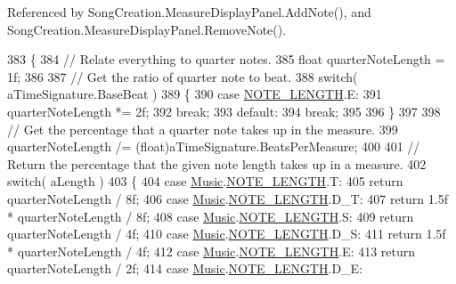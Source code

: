 Referenced by Song\+Creation.\+Measure\+Display\+Panel.\+Add\+Note(), and Song\+Creation.\+Measure\+Display\+Panel.\+Remove\+Note().


\begin{DoxyCode}
383     \{
384         \textcolor{comment}{// Relate everything to quarter notes.}
385         \textcolor{keywordtype}{float} quarterNoteLength = 1f;
386 
387         \textcolor{comment}{// Get the ratio of quarter note to beat.}
388         \textcolor{keywordflow}{switch}( aTimeSignature.BaseBeat )
389         \{
390             \textcolor{keywordflow}{case} \hyperlink{group___music_enums_gaf11b5f079adbb21c800b9eca1c5c3cbd}{NOTE\_LENGTH}.E:
391                 quarterNoteLength *= 2f;
392                 \textcolor{keywordflow}{break};
393             \textcolor{keywordflow}{default}:
394                 \textcolor{keywordflow}{break};
395 
396         \}
397 
398         \textcolor{comment}{// Get the percentage that a quarter note takes up in the measure.}
399         quarterNoteLength /= (float)aTimeSignature.BeatsPerMeasure;
400 
401         \textcolor{comment}{// Return the percentage that the given note length takes up in a measure.}
402         \textcolor{keywordflow}{switch}( aLength )
403         \{
404             \textcolor{keywordflow}{case} \hyperlink{class_music}{Music}.\hyperlink{group___music_enums_gaf11b5f079adbb21c800b9eca1c5c3cbd}{NOTE\_LENGTH}.T:
405                 \textcolor{keywordflow}{return} quarterNoteLength / 8f;
406             \textcolor{keywordflow}{case} \hyperlink{class_music}{Music}.\hyperlink{group___music_enums_gaf11b5f079adbb21c800b9eca1c5c3cbd}{NOTE\_LENGTH}.D\_T:
407                 \textcolor{keywordflow}{return} 1.5f * quarterNoteLength / 8f;
408             \textcolor{keywordflow}{case} \hyperlink{class_music}{Music}.\hyperlink{group___music_enums_gaf11b5f079adbb21c800b9eca1c5c3cbd}{NOTE\_LENGTH}.S:
409                 \textcolor{keywordflow}{return} quarterNoteLength / 4f;
410             \textcolor{keywordflow}{case} \hyperlink{class_music}{Music}.\hyperlink{group___music_enums_gaf11b5f079adbb21c800b9eca1c5c3cbd}{NOTE\_LENGTH}.D\_S:
411                 \textcolor{keywordflow}{return} 1.5f * quarterNoteLength / 4f;
412             \textcolor{keywordflow}{case} \hyperlink{class_music}{Music}.\hyperlink{group___music_enums_gaf11b5f079adbb21c800b9eca1c5c3cbd}{NOTE\_LENGTH}.E:
413                 \textcolor{keywordflow}{return} quarterNoteLength / 2f;
414             \textcolor{keywordflow}{case} \hyperlink{class_music}{Music}.\hyperlink{group___music_enums_gaf11b5f079adbb21c800b9eca1c5c3cbd}{NOTE\_LENGTH}.D\_E:

\end{DoxyCode}
